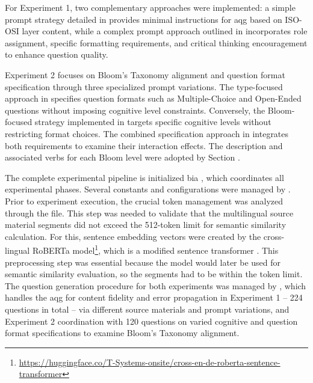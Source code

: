 For Experiment 1, two complementary approaches were implemented: a simple prompt strategy detailed in  provides minimal instructions for \ac{aqg} based on ISO-OSI layer content, while a complex prompt approach outlined in  incorporates role assignment, specific formatting requirements, and critical thinking encouragement to enhance question quality.

\pagebreak

Experiment 2 focuses on Bloom's Taxonomy alignment and question format specification through three specialized prompt variations. The type-focused approach in  specifies question formats such as Multiple-Choice and Open-Ended questions without imposing cognitive level constraints. Conversely, the Bloom-focused strategy implemented in  targets specific cognitive levels without restricting format choices. The combined specification approach in  integrates both requirements to examine their interaction effects. The description and associated verbs for each Bloom level were adopted by Section .

The complete experimental pipeline is initialized bia , which coordinates all experimental phases. Several constants and configurations were managed by . Prior to experiment execution, the crucial token management was analyzed through the  file. This step was needed to validate that the multilingual source material segments did not exceed the 512-token limit for semantic similarity calculation. For this, sentence embedding vectors were created by the cross-lingual RoBERTa model\footnote{\url{https://huggingface.co/T-Systems-onsite/cross-en-de-roberta-sentence-transformer}}, which is a modified sentence transformer \cite{reimers_sentence-bert_2019}. This preprocessing step was essential because the model would later be used for semantic similarity evaluation, so the segments had to be within the token limit.
The question generation procedure for both experiments was managed by , which handles the \ac{aqg} for content fidelity and error propagation in Experiment 1 -- 224 questions in total -- via different source materials and prompt variations, and Experiment 2 coordination with 120 questions on varied cognitive and question format specifications to examine Bloom's Taxonomy alignment.

